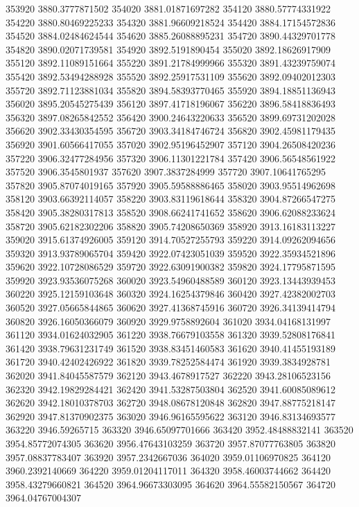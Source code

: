 {353920 3880.3777871502
354020 3881.01871697282
354120 3880.57774331922
354220 3880.80469225233
354320 3881.96609218524
354420 3884.17154572836
354520 3884.02484624544
354620 3885.26088895231
354720 3890.44329701778
354820 3890.02071739581
354920 3892.5191890454
355020 3892.18626917909
355120 3892.11089151664
355220 3891.21784999966
355320 3891.43239759074
355420 3892.53494288928
355520 3892.25917531109
355620 3892.09402012303
355720 3892.71123881034
355820 3894.58393770465
355920 3894.18851136943
356020 3895.20545275439
356120 3897.41718196067
356220 3896.58418836493
356320 3897.08265842552
356420 3900.24643220633
356520 3899.69731202028
356620 3902.33430354595
356720 3903.34184746724
356820 3902.45981179435
356920 3901.60566417055
357020 3902.95196452907
357120 3904.26508420236
357220 3906.32477284956
357320 3906.11301221784
357420 3906.56548561922
357520 3906.3545801937
357620 3907.3837284999
357720 3907.10641765295
357820 3905.87074019165
357920 3905.59588886465
358020 3903.95514962698
358120 3903.66392114057
358220 3903.83119618644
358320 3904.87266547275
358420 3905.38280317813
358520 3908.66241741652
358620 3906.62088233624
358720 3905.62182302206
358820 3905.74208650369
358920 3913.16183113227
359020 3915.61374926005
359120 3914.70527255793
359220 3914.09262094656
359320 3913.93789065704
359420 3922.07423051039
359520 3922.35934521896
359620 3922.10728086529
359720 3922.63091900382
359820 3924.17795871595
359920 3923.93536075268
360020 3923.54960488589
360120 3923.13443939453
360220 3925.12159103648
360320 3924.16254379846
360420 3927.42382002703
360520 3927.05665844865
360620 3927.41368745916
360720 3926.34139414794
360820 3926.16050366079
360920 3929.9758892604
361020 3934.04168131997
361120 3934.01624032905
361220 3938.76679103558
361320 3939.52808176841
361420 3938.79631231749
361520 3938.83451460583
361620 3940.41455193189
361720 3940.42402426922
361820 3939.78252584474
361920 3939.3834928781
362020 3941.84045587579
362120 3943.4678917527
362220 3943.28106523156
362320 3942.19829284421
362420 3941.53287503804
362520 3941.60085089612
362620 3942.18010378703
362720 3948.08678120848
362820 3947.88775218147
362920 3947.81370902375
363020 3946.96165595622
363120 3946.83134693577
363220 3946.59265715
363320 3946.65097701666
363420 3952.48488832141
363520 3954.85772074305
363620 3956.47643103259
363720 3957.87077763805
363820 3957.08837783407
363920 3957.2342667036
364020 3959.01106970825
364120 3960.2392140669
364220 3959.01204117011
364320 3958.46003744662
364420 3958.43279660821
364520 3964.96673303095
364620 3964.55582150567
364720 3964.04767004307
}
